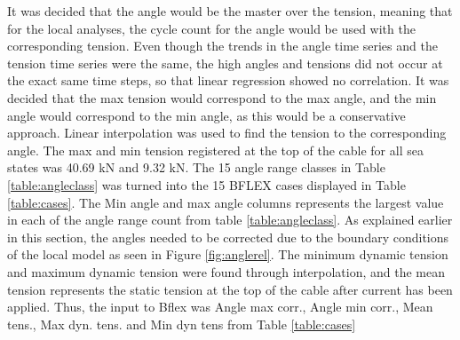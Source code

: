 \noindent It was decided that the angle would be the master over the tension, meaning that for the local analyses, the cycle count for the angle would be used with the corresponding tension. Even though the trends in the angle time series and the tension time series were the same, the high angles and tensions did not occur at the exact same time steps, so that linear regression showed no correlation. It was decided that the max tension would correspond to the max angle, and the min angle would correspond to the min angle, as this would be a conservative approach.  Linear interpolation was used to find the tension to the corresponding angle. The max and min tension registered at the top of the cable for all sea states was 40.69 kN and 9.32 kN. \newline
\newline
\noindent The 15 angle range classes in Table \ref{table:angleclass} was turned into the 15 BFLEX cases displayed in Table \ref{table:cases}. The Min angle and max angle columns represents the largest value in each of the angle range count from table \ref{table:angleclass}. As explained earlier in this section, the angles needed to be corrected due to the boundary conditions of the local model as seen in Figure \ref{fig:anglerel}. The minimum dynamic tension and maximum dynamic tension were found through interpolation, and the mean tension represents the static tension at the top of the cable after current has been applied. Thus, the input to Bflex was Angle max corr., Angle min corr., Mean tens., Max dyn. tens. and Min dyn tens from Table \ref{table:cases}


